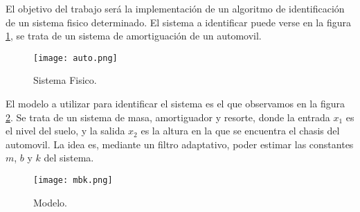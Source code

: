 El objetivo del trabajo será la implementación de un algoritmo de identificación de un sistema fisico determinado. El sistema a identificar puede verse en la figura \ref{fig:auto}, se trata de un sistema de amortiguación de un automovil.

\vspace*{\fill}
\begin{figure}[H]
\centering
\texttt{[image: auto.png]}
\caption{Sistema Fisico.}
\label{fig:auto} 
\end{figure}
\vspace*{\fill}

El modelo a utilizar para identificar el sistema es el que observamos en la figura \ref{fig:mbk}. Se trata de un sistema de masa, amortiguador y resorte, donde la entrada $x_{1}$ es el nivel del suelo, y la salida $x_{2}$ es la altura en la que se encuentra el chasis del automovil. La idea es, mediante un filtro adaptativo, poder estimar las constantes $m$, $b$ y $k$ del sistema.

\vspace*{\fill}
\begin{figure}[H]
\centering
\texttt{[image: mbk.png]}
\caption{Modelo.}
\label{fig:mbk} 
\end{figure}
\vspace*{\fill}
